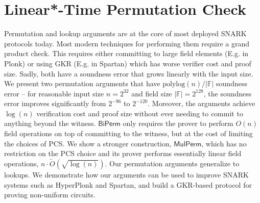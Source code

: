 \documentclass[11pt,oneside]{book}
\theoremstyle{definition}
\theoremstyle{remark}
\theoremstyle{plain}
\begin{document}
\section{\cite{cryptoeprint:2025/1850} Linear*-Time Permutation Check}
Permutation and lookup arguments are at the core of most deployed SNARK protocols today. Most modern techniques for performing them require a grand product check. This requires either committing to large field elements (E.g. in Plonk) or using GKR (E.g. in Spartan) which has worse verifier cost and proof size. Sadly, both have a soundness error that grows linearly with the input size. We present two permutation arguments that have $\text{polylog}(n)/|\mathbb{F}|$ soundness error -- for reasonable input size $n=2^{32}$ and field size $|\mathbb{F}|=2^{128}$, the soundness error improves significantly from $2^{-96}$ to $2^{-120}$. Moreover, the arguments achieve $\log(n)$ verification cost and proof size without ever needing to commit to anything beyond the witness. $\mathsf{BiPerm}$ only requires the prover to perform $O(n)$ field operations on top of committing to the witness, but at the cost of limiting the choices of PCS. We show a stronger construction, $\mathsf{MulPerm}$, which has no restriction on the PCS choice and its prover performs essentially linear field operations, $n\cdot \tilde O(\sqrt{\log(n)})$. Our permutation arguments generalize to lookups. We demonstrate how our arguments can be used to improve SNARK systems such as HyperPlonk and Spartan, and build a GKR-based protocol for proving non-uniform circuits.
\end{document}
